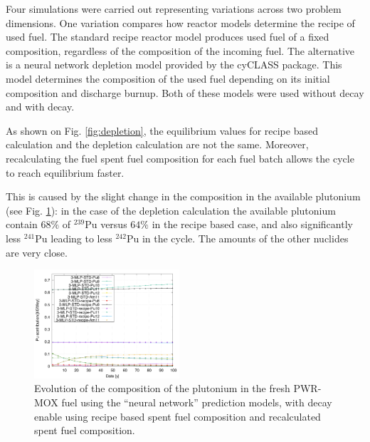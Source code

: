 \documentclass{anstrans}
\begin{document}


Four simulations were carried out representing variations across two problem
dimensions.  One variation compares how reactor models determine the recipe of
used fuel.  The standard recipe reactor model produces used fuel of a fixed
composition, regardless of the composition of the incoming fuel.  The
alternative is a neural network depletion model provided by the cyCLASS
package.  This model determines the composition of the used fuel depending on
its initial composition and discharge burnup.  Both of these models were used
without decay and with decay.

As shown on Fig. \ref{fig:depletion}, the equilibrium values for recipe based
calculation and the depletion calculation are not the same. Moreover,
recalculating the fuel spent fuel composition for each fuel batch allows the
cycle to reach equilibrium faster.

This is caused by the slight change in the composition in the available plutonium
(see Fig. \ref{fig:depletioncompo}): in the case of the depletion calculation
the available plutonium contain $68\%$ of $^{239}$Pu versus $64\%$ in the recipe
based case, and also significantly less $^{241}$Pu leading to less $^{242}$Pu in
the cycle. The amounts of the other nuclides are very close.

\begin{figure}[ht] %
  \centering
  \includegraphics[width=0.48\textwidth]{MOX_pu_composition.png}
  \caption{Evolution of the composition of the plutonium in the fresh PWR-MOX fuel
  using the ``neural network'' prediction models, with decay enable using recipe
based spent fuel composition and recalculated spent fuel composition.}
  \label{fig:depletioncompo}
\end{figure}
\end{document}
